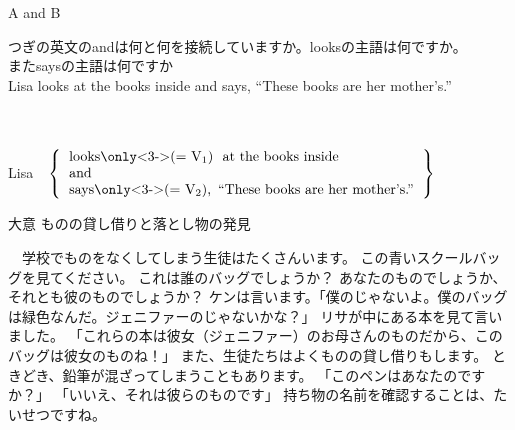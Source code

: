 \documentclass[aspectratio=169,xcolor={dvipsnames,table}]{beamer}
\begin{document}
\begin{frame}[plain]{A and B}

\begin{description}[　　]
 \item[Q]<1-> つぎの英文のandは何と何を接続していますか。looksの主語は何ですか。\\またsaysの主語は何ですか\\[10pt]
Lisa looks at the books inside and says, ``These books are her mother's.''\\
　
 \item[A]<2->  \mbox{}\\
Lisa \,\, $\left\{ 
\begin{tabular}{l}
 looks\only<3->{($=$ V$_1$)}\,\, at the books inside\\
 and\\
 says\only<3->{($=$ V$_2$)},\,\ ``These books are her mother's.''\\
\end{tabular}
\right\}$

\end{description}

\end{frame}
\begin{frame}{大意}
ものの貸し借りと落とし物の発見

\bigskip
 
　学校でものをなくしてしまう生徒はたくさんいます。
この青いスクールバッグを見てください。
これは誰のバッグでしょうか？
あなたのものでしょうか、それとも彼のものでしょうか？
ケンは言います。「僕のじゃないよ。僕のバッグは緑色なんだ。ジェニファーのじゃないかな？」
リサが中にある本を見て言いました。
「これらの本は彼女（ジェニファー）のお母さんのものだから、このバッグは彼女のものね！」
また、生徒たちはよくものの貸し借りもします。
ときどき、鉛筆が混ざってしまうこともあります。
「このペンはあなたのですか？」
「いいえ、それは彼らのものです」
持ち物の名前を確認することは、たいせつですね。
\end{frame}
\end{document}
